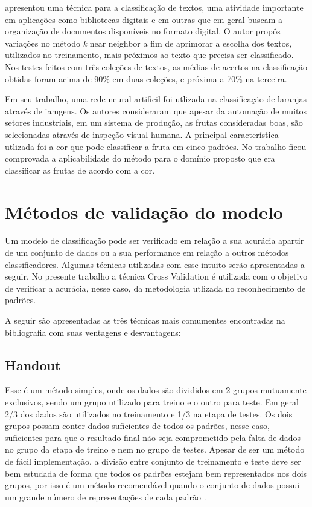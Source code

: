  apresentou uma técnica para a classificação de textos, uma atividade importante em aplicações como bibliotecas digitais e em outras que em geral buscam a organização de documentos disponíveis no formato digital. O autor propôs variações no método \textit{k} near neighbor a fim de  aprimorar a escolha dos textos, utilizados no treinamento, mais próximos ao texto que precisa ser classificado. Nos testes feitos com três coleções de textos, as médias de acertos na classificação obtidas foram acima de 90\% em duas coleções, e próxima a 70\% na terceira.

Em seu trabalho,  uma rede neural artificil foi utlizada na classificação de laranjas através de iamgens. Os autores consideraram que apesar da automação de muitos setores industriais, em um sistema de produção, as frutas consideradas boas, são selecionadas através de inspeção visual humana. A principal característica utlizada foi a cor que pode classificar a fruta em cinco padrões. No trabalho ficou comprovada a aplicabilidade do método para o domínio proposto que era classificar as frutas de acordo com a cor.

\section{Métodos de validação do modelo}
Um modelo de classificação pode ser verificado em relação a sua acurácia apartir de um conjunto de dados ou a sua performance em relação a outros métodos classificadores. Algumas técnicas utilizadas com esse intuito serão apresentadas a seguir. No presente trabalho a técnica Cross Validation é utilizada com o objetivo de verificar a acurácia, nesse caso, da metodologia utlizada no reconhecimento de padrões.

A seguir são apresentadas as três técnicas mais comumentes encontradas na bibliografia com suas ventagens e desvantagens:

\subsection{Handout}
Esse é um método simples, onde os dados são divididos em 2 grupos mutuamente exclusivos, sendo um grupo utilizado para treino e o outro para teste. Em geral 2/3 dos dados são utilizados no treinamento e 1/3 na etapa de testes. Os dois grupos possam conter dados suficientes de todos os padrões, nesse caso, suficientes para que o resultado final não seja comprometido pela falta de dados no grupo da etapa de treino e nem no grupo de testes. Apesar de ser um método de fácil implementação, a divisão entre conjunto de treinamento e teste deve ser bem estudada de forma que todos os padrões estejam bem representados nos dois grupos, por isso é um método recomendável quando o conjunto de dados possui um grande número de representações de cada padrão \cite{Kohavi95Cross} \cite{Baldisserotto05Validacao}.

